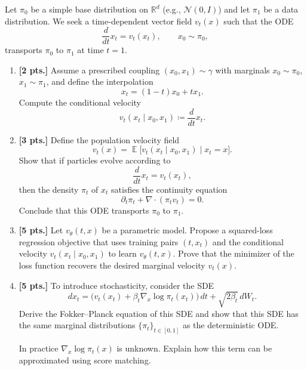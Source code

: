 \documentclass[11pt,a4paper]{article}
\DeclareMathOperator{\E}{\mathbb{E}}
\newcommand{\examstatement}[1]{%
  \par\addvspace{0.85em}%
  \noindent{\bfseries #1}\par\nobreak\addvspace{0.28em}%
}
\begin{document}
\examstatement{Problem 2. [15 pts.]}
Let $\pi_0$ be a simple base distribution on $\mathbb{R}^{d}$ (e.g., $\mathcal{N}(0, I)$) and let $\pi_1$ be a data distribution. We seek a time-dependent vector field $v_t(x)$ such that the ODE
\[
\frac{d}{dt} x_t = v_t(x_t), \qquad x_0 \sim \pi_0,
\]
transports $\pi_0$ to $\pi_1$ at time $t = 1$.
\begin{enumerate}[label=(\alph*)]
    \item \textbf{[2 pts.]} Assume a prescribed coupling $(x_0, x_1) \sim \gamma$ with marginals $x_0 \sim \pi_0$, $x_1 \sim \pi_1$, and define the interpolation
    \[
    x_t = (1 - t)x_0 + t x_1.
    \]
    Compute the conditional velocity
    \[
    v_t(x_t \mid x_0, x_1) \coloneqq \frac{d}{dt} x_t.
    \]
    \item \textbf{[3 pts.]} Define the population velocity field
    \[
    v_t(x) = \E\bigl[v_t(x_t \mid x_0, x_1) \mid x_t = x\bigr].
    \]
    Show that if particles evolve according to
    \[
    \frac{d}{dt} x_t = v_t(x_t),
    \]
    then the density $\pi_t$ of $x_t$ satisfies the continuity equation
    \[
    \partial_t \pi_t + \nabla \cdot (\pi_t v_t) = 0.
    \]
    Conclude that this ODE transports $\pi_0$ to $\pi_1$.
    \item \textbf{[5 pts.]} Let $v_{\theta}(t, x)$ be a parametric model. Propose a squared-loss regression objective that uses training pairs $(t, x_t)$ and the conditional velocity $v_t(x_t \mid x_0, x_1)$ to learn $v_{\theta}(t, x)$. Prove that the minimizer of the loss function recovers the desired marginal velocity $v_t(x)$.
    \item \textbf{[5 pts.]} To introduce stochasticity, consider the SDE
    \[
    d x_t = \bigl( v_t(x_t) + \beta_t \nabla_x \log \pi_t(x_t) \bigr)\, dt + \sqrt{2\beta_t}\, dW_t.
    \]
    Derive the Fokker--Planck equation of this SDE and show that this SDE has the same marginal distributions $\{\pi_t\}_{t \in [0,1]}$ as the deterministic ODE.

    In practice $\nabla_x \log \pi_t(x)$ is unknown. Explain how this term can be approximated using score matching.
\end{enumerate}
\end{document}
